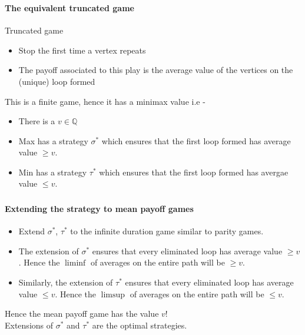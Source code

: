 \documentclass{beamer}
\newenvironment{slide}
{\begin{frame}[environment=slide]
\frametitle{\insertsection}}
{\end{frame}}
\begin{document}
  \begin{slide}
      \framesubtitle{The equivalent truncated game}
      \begin{block}{Truncated game}
          \begin{itemize}
          \item Stop the first time a vertex repeats
          \item The payoff associated to this play is the average value of the vertices on the (unique) loop formed
          \end{itemize}
      \end{block}

      This is a finite game, hence it has a minimax value i.e -
      \begin{itemize}
          \item There is a $v \in \mathbb{Q}$
          \item Max has a strategy $\sigma^*$ which ensures that the first loop formed has average value $\geq v$.
          \item Min has a strategy $\tau^*$ which ensures that the first loop formed has avergae value $\leq v$.
      \end{itemize}
  \end{slide}

  \begin{slide}
      \framesubtitle{Extending the strategy to mean payoff games}
      \begin{itemize}
          \item Extend $\sigma^*$, $\tau^*$ to the infinite duration game similar to parity games.
          \item The extension of $\sigma^*$  ensures that every eliminated loop has average value $\geq v$. Hence the $\liminf$ of averages on the entire path will be $\geq v$.
          \item Similarly, the extension of $\tau^*$ ensures that every eliminated loop has average value $\leq v$. Hence the $\limsup$ of averages on the entire path will be $\leq v$.
      \end{itemize}
      \pause
      Hence the mean payoff game has the value $v$! \\
      Extensions of $\sigma^*$ and $\tau^*$ are the optimal strategies.
  \end{slide}
\end{document}
